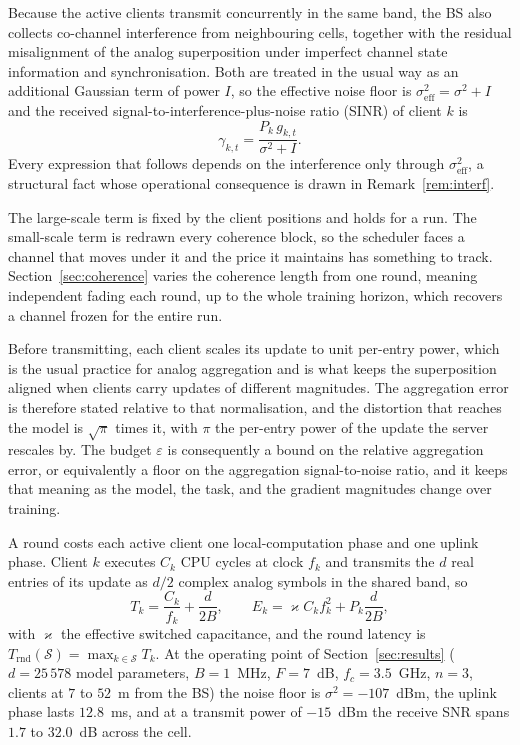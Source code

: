 \documentclass[lettersize,journal]{IEEEtran}
\newcommand{\calS}{\mathcal{S}}
\begin{document}
Because the active clients transmit concurrently in the same band, the BS also collects co-channel interference from neighbouring cells, together with the residual misalignment of the analog superposition under imperfect channel state information and synchronisation. Both are treated in the usual way as an additional Gaussian term of power $I$, so the effective noise floor is $\sigma^{2}_{\mathrm{eff}}=\sigma^{2}+I$ and the received signal-to-interference-plus-noise ratio (SINR) of client $k$ is
\begin{equation}
\gamma_{k,t}=\frac{P_{k}\,g_{k,t}}{\sigma^{2}+I}.
\label{eq:sinr}
\end{equation}
Every expression that follows depends on the interference only through $\sigma^{2}_{\mathrm{eff}}$, a structural fact whose operational consequence is drawn in Remark~\ref{rem:interf}.

The large-scale term is fixed by the client positions and holds for a run. The small-scale term is redrawn every coherence block, so the scheduler faces a channel that moves under it and the price it maintains has something to track. Section~\ref{sec:coherence} varies the coherence length from one round, meaning independent fading each round, up to the whole training horizon, which recovers a channel frozen for the entire run.

Before transmitting, each client scales its update to unit per-entry power, which is the usual practice for analog aggregation and is what keeps the superposition aligned when clients carry updates of different magnitudes. The aggregation error is therefore stated relative to that normalisation, and the distortion that reaches the model is $\sqrt{\pi}$ times it, with $\pi$ the per-entry power of the update the server rescales by. The budget $\varepsilon$ is consequently a bound on the relative aggregation error, or equivalently a floor on the aggregation signal-to-noise ratio, and it keeps that meaning as the model, the task, and the gradient magnitudes change over training.

A round costs each active client one local-computation phase and one uplink phase. Client $k$ executes $C_{k}$ CPU cycles at clock $f_{k}$ and transmits the $d$ real entries of its update as $d/2$ complex analog symbols in the shared band, so
\begin{equation}
T_{k}=\frac{C_{k}}{f_{k}}+\frac{d}{2B},
\qquad
E_{k}=\varkappa C_{k}f_{k}^{2}+P_{k}\frac{d}{2B},
\label{eq:latency}
\end{equation}
with $\varkappa$ the effective switched capacitance, and the round latency is $T_{\mathrm{rnd}}(\calS)=\max_{k\in\calS}T_{k}$. At the operating point of Section~\ref{sec:results} ($d=25\,578$ model parameters, $B=1$~MHz, $F=7$~dB, $f_{c}=3.5$~GHz, $n=3$, clients at $7$ to $52$~m from the BS) the noise floor is $\sigma^{2}=-107$~dBm, the uplink phase lasts $12.8$~ms, and at a transmit power of $-15$~dBm the receive SNR spans $1.7$ to $32.0$~dB across the cell.
\end{document}
